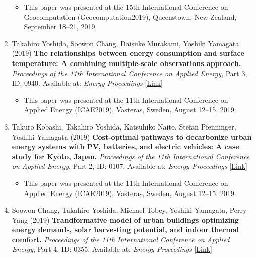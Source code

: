 \documentclass[]{book}
\providecommand{\tightlist}{%
  \setlength{\itemsep}{0pt}\setlength{\parskip}{0pt}}
\begin{document}
\begin{enumerate}
  \begin{itemize}
  \tightlist
  \item
    This paper was presented at the 15th International Conference on Geocomputation (Geocomputation2019), Queenstown, New Zealand, September 18--21, 2019.
  \end{itemize}
\item
  Takahiro Yoshida, Soowon Chang, Daisuke Murakami, Yoshiki Yamagata (2019)
  \textbf{The relationships between energy consumption and surface temperature: A combining multiple-scale observations approach.}
  \emph{Proceedings of the 11th International Conference on Applied Energy}, Part 3, ID: 0940.
  Available at: \emph{Energy Proceedings} {[}\href{https://www.energy-proceedings.org/the-relationship-between-energy-consumption-and-surface-temperature-combining-multiple-scale-observations/}{Link}{]}

  \begin{itemize}
  \tightlist
  \item
    This paper was presented at the 11th International Conference on Applied Energy (ICAE2019), Vasteras, Sweden, August 12--15, 2019.
  \end{itemize}
\item
  Takuro Kobashi, Takahiro Yoshida, Katsuhiko Naito, Stefan Pfenninger, Yoshiki Yamagata (2019)
  \textbf{Cost-optimal pathways to decarbonize urban energy systems with PV, batteries, and electric vehicles: A case study for Kyoto, Japan.}
  \emph{Proceedings of the 11th International Conference on Applied Energy}, Part 2, ID: 0107.
  Available at: \emph{Energy Proceedings} {[}\href{https://www.energy-proceedings.org/cost-optimal-pathways-to-decarbonize-urban-energy-systems-with-pv-batteries-and-electric-vehicles-a-case-study-for-kyoto-japan/}{Link}{]}

  \begin{itemize}
  \tightlist
  \item
    This paper was presented at the 11th International Conference on Applied Energy (ICAE2019), Vasteras, Sweden, August 12--15, 2019.
  \end{itemize}
\item
  Soowon Chang, Takahiro Yoshida, Michael Tobey, Yoshiki Yamagata, Perry Yang (2019)
  \textbf{Trandformative model of urban buildings optimizing energy demands, solar harvesting potential, and indoor thermal comfort.}
  \emph{Proceedings of the 11th International Conference on Applied Energy}, Part 4, ID: 0355.
  Available at: \emph{Energy Proceedings} {[}\href{https://www.energy-proceedings.org/transformative-model-of-urban-buildings-optimizing-energy-demands-solar-harvesting-potential-and-indoor-thermal-comfort/}{Link}{]}


\end{enumerate}
\end{document}
